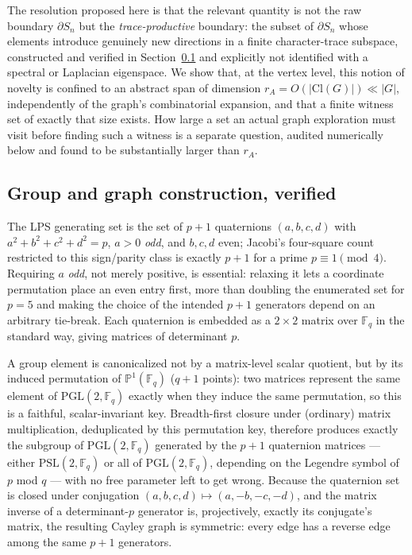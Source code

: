 \documentclass[11pt,a4paper]{article}
\theoremstyle{plain}
\theoremstyle{definition}
\theoremstyle{remark}
\newcommand{\F}{\mathbb{F}}
\newcommand{\Cl}{\mathrm{Cl}}
\newcommand{\PSL}{\mathrm{PSL}}
\begin{document}
    The resolution proposed here is that the relevant quantity is not the raw boundary $\partial S_n$
    but the \emph{trace-productive} boundary: the subset of $\partial S_n$ whose elements
    introduce genuinely new directions in a finite character-trace subspace, constructed and
    verified in Section~\ref{sec:group-construction} and explicitly not identified with a spectral
    or Laplacian eigenspace.
    We show that, at the vertex level, this notion of novelty is confined to an abstract span of
    dimension $r_A = O(|\Cl(G)|) \ll |G|$, independently of the graph's combinatorial expansion,
    and that a finite witness set of exactly that size exists.
    How large a set an actual graph exploration must visit before finding such a witness is a
    separate question, audited numerically below and found to be substantially larger than $r_A$.

    \subsection{Group and graph construction, verified}
      \label{sec:group-construction}

      The LPS generating set is the set of $p+1$ quaternions $(a,b,c,d)$ with
      $a^2+b^2+c^2+d^2=p$, $a>0$ \emph{odd}, and $b,c,d$ even; Jacobi's four-square count restricted
      to this sign/parity class is exactly $p+1$ for a prime $p \equiv 1 \pmod 4$.
      Requiring $a$ \emph{odd}, not merely positive, is essential: relaxing it lets a coordinate
      permutation place an even entry first, more than doubling the enumerated set for $p=5$ and
      making the choice of the intended $p+1$ generators depend on an arbitrary tie-break.
      Each quaternion is embedded as a $2\times2$ matrix over $\F_q$ in the standard way, giving
      matrices of determinant $p$.

      A group element is canonicalized not by a matrix-level scalar quotient, but by its induced
      permutation of $\mathbb{P}^1(\F_q)$ ($q+1$ points): two matrices represent the same element of
      $\mathrm{PGL}(2,\F_q)$ exactly when they induce the same permutation, so this is a faithful,
      scalar-invariant key.
      Breadth-first closure under (ordinary) matrix multiplication, deduplicated by this
      permutation key, therefore produces exactly the subgroup of $\mathrm{PGL}(2,\F_q)$ generated
      by the $p+1$ quaternion matrices --- either $\PSL(2,\F_q)$ or all of $\mathrm{PGL}(2,\F_q)$,
      depending on the Legendre symbol of $p$ mod $q$ --- with no free parameter left to get wrong.
      Because the quaternion set is closed under conjugation $(a,b,c,d) \mapsto (a,-b,-c,-d)$, and
      the matrix inverse of a determinant-$p$ generator is, projectively, exactly its conjugate's
      matrix, the resulting Cayley graph is symmetric: every edge has a reverse edge among the same
      $p+1$ generators.
\end{document}
